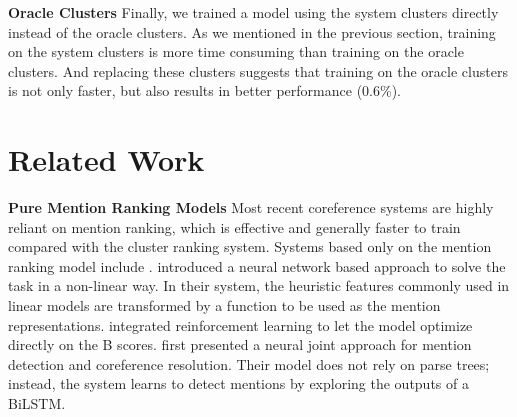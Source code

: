 \documentclass[10pt, a4paper]{article}
\begin{document}
\textbf{Oracle Clusters} Finally, we trained a model using the system clusters directly instead of the oracle clusters. 
As we mentioned in the previous section,  training on the system clusters is more time consuming than training on the oracle clusters. 
And replacing these clusters  suggests that training on the oracle clusters is not only faster, but also results in  better performance (0.6\%). 



\section{Related Work}
\textbf{Pure Mention Ranking Models} Most recent coreference systems are highly reliant on  mention ranking, which is
effective and generally faster to train  
compared with the cluster ranking system. 
Systems  based only on the mention ranking model include \cite{wiseman2015learning,clark2016improving,lee2017end}.  introduced a neural network based approach to solve the task in a non-linear way. 
In their system, the heuristic features commonly used in  linear models are transformed by a  function to be used as the mention representations. 
 integrated  reinforcement learning to let the model optimize directly on the B scores. 
 first presented a neural joint approach for mention detection and coreference resolution. Their model does not rely on  parse trees; instead, the system learns to detect  mentions by exploring the outputs of a BiLSTM. 
\end{document}
